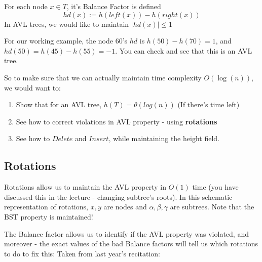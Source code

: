     \begin{framed}
      \begin{definition}
        For each node $x\in T$, it's Balance Factor is defined 
        $$hd (x) := h(left(x)) - h(right(x))$$ In AVL trees, we would like to maintain
        $|hd(x)| \leq 1$
      \end{definition}
    \end{framed}
\begin{example} For our working example, the node $60$'s $hd$ is $h(50) - h
(70) = 1$, and $hd(50) = h(45)- h(55) = -1$. You can check and see that this is an AVL tree.
\end{example}
So to make sure that we can actually maintain time complexity $O(\log(n))$, we would want to:
\begin{enumerate}
    \item Show that for an AVL tree, $h(T) = \theta(log(n))$ (If there's time
    left)
    \item See how to correct violations in AVL property - using \textbf{rotations}
    \item See how to $Delete$ and $Insert$, while maintaining the height field.
\end{enumerate}

\subsection{Rotations}
\begin{figure}[h]
  \centering
      
\end{figure}
Rotations allow us to maintain the AVL property in $O(1)$ time (you have
discussed this in the lecture - changing subtree's roots).
In this schematic representation of rotations, $x,y$ are nodes and $\alpha,\beta,\gamma$ are subtrees. Note that the BST property is maintained! 


The Balance factor allows us to identify if the AVL property was violated, and moreover -
the exact values of the bad Balance factors will tell us which rotations to do to fix
this:
Taken from last year's recitation:

